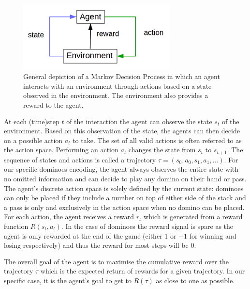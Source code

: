 \documentclass[12pt,a4paper]{article}
\begin{document}
\begin{figure}
  \includegraphics[width=8cm]{img/mdp.png}
  \centering 
  \caption{General depiction of a Markov Decision Process in which an agent interacts with an environment through actions based on a state observed in the environment. The environment also provides a reward to the agent.}
  \label{fig:mdp}
 
\end{figure}

At each (time)step $t$ of the interaction the agent can observe the state $s_t$ of the environment. Based on this observation of the state, the agents can then decide on a possible action $a_t$ to take. The set of all valid actions is often referred to as the action space. Performing an action $a_t$ changes the state from $s_t$ to $s_{t+1}$. The sequence of states and actions is called a trajectory $\tau = (s_0, a_0, s_1, a_1, …)$. For our specific dominoes encoding, the agent always observes the entire state with no omitted information and can decide to play any domino on their hand or pass. The agent’s discrete action space is solely defined by the current state: dominoes can only be placed if they include a number on top of either side of the stack and a pass is only and exclusively in the action space when no domino can be placed. 
For each action, the agent receives a reward $r_t$ which is generated from a reward function $R(s_t, a_t)$. In the case of dominoes the reward signal is spare as the agent is only rewarded at the end of the game (either $1$ or $-1$ for winning and losing respectively) and thus the reward for most steps will be $0$. 

The overall goal of the agent is to maximise the cumulative reward over the trajectory $\tau$ which is the expected return of rewards for a given trajectory. In our specific case, it is the agent’s goal to get to $R(\tau)$ as close to one as possible. 
\end{document}
